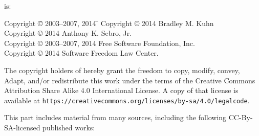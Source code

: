 {\parindent 0in
 is: \\
\begin{tabbing}
Copyright \= \copyright{} 2003--2007, 2014 \hspace{.1mm} \=  \kill
Copyright \> \copyright{} 2014 \> Bradley M. Kuhn \\
Copyright \> \copyright{} 2014 \>  Anthony K. Sebro, Jr. \\
Copyright \> \copyright{} 2003--2007, 2014 \>  Free Software Foundation, Inc. \\
Copyright \> \copyright{} 2014 \>  Software Freedom Law Center.
\end{tabbing}


\vspace{.2in}

\begin{center}

The copyright holders of  hereby grant the freedom to copy, modify,
convey, Adapt, and/or redistribute this work under the terms of the Creative
Commons Attribution Share Alike 4.0 International License.  A copy of that
license is available at
\verb=https://creativecommons.org/licenses/by-sa/4.0/legalcode=.
\end{center}

\vfill

This part includes material from many sources, including the following
CC-By-SA-licensed published works: \\

}
